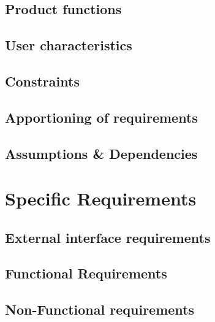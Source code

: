 \documentclass{report}
\begin{document}
  \newpage
  \section{Product functions}
  

  \newpage
  \section{User characteristics} %
  
  \newpage
  \section{Constraints}
  
  
  \newpage
  \section{Apportioning of requirements}
  

  \newpage
  \section{Assumptions \& Dependencies}
  
  \newpage
  
\chapter{Specific Requirements}



  \section{External interface requirements}
  

  \section{Functional Requirements}
  
  

  \newpage

  \section{Non-Functional requirements}
  
  
\end{document}
